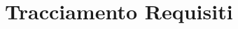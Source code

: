 \documentclass[../RelazioneFinale.tex]{subfiles}
\begin{document}
\chapter{Tracciamento Requisiti}
\end{document}
